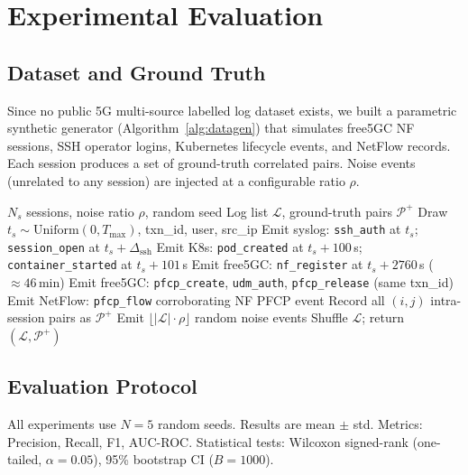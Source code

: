 \section{Experimental Evaluation}
\label{sec:experiments}

\subsection{Dataset and Ground Truth}
\label{sec:dataset}

Since no public 5G multi-source labelled log dataset exists, we built a
parametric synthetic generator (Algorithm~\ref{alg:datagen}) that
simulates free5GC NF sessions, SSH operator logins, Kubernetes lifecycle
events, and NetFlow records. Each session produces a set of ground-truth
correlated pairs. Noise events (unrelated to any session) are injected at
a configurable ratio $\rho$.

\begin{algorithm}[t]
\caption{Synthetic Dataset Generation}
\label{alg:datagen}
\begin{algorithmic}[1]
\Require $N_s$ sessions, noise ratio $\rho$, random seed
\Ensure Log list $\mathcal{L}$, ground-truth pairs $\mathcal{P}^+$
  \State Draw $t_s \sim \text{Uniform}(0, T_{\max})$, txn\_id, user, src\_ip
  \State Emit syslog: \texttt{ssh\_auth} at $t_s$; \texttt{session\_open} at $t_s + \Delta_{\text{ssh}}$
  \State Emit K8s: \texttt{pod\_created} at $t_s + 100$\,s; \texttt{container\_started} at $t_s + 101$\,s
  \State Emit free5GC: \texttt{nf\_register} at $t_s + 2760$\,s ($\approx 46$\,min)
  \State Emit free5GC: \texttt{pfcp\_create}, \texttt{udm\_auth}, \texttt{pfcp\_release} (same txn\_id)
  \State Emit NetFlow: \texttt{pfcp\_flow} corroborating NF PFCP event
  \State Record all $(i,j)$ intra-session pairs as $\mathcal{P}^+$
\EndFor
\State Emit $\lfloor|\mathcal{L}|\cdot\rho\rfloor$ random noise events
\State Shuffle $\mathcal{L}$; return $(\mathcal{L}, \mathcal{P}^+)$
\end{algorithmic}
\end{algorithm}

\subsection{Evaluation Protocol}

All experiments use $N=5$ random seeds. Results are mean $\pm$ std.
Metrics: Precision, Recall, F1, AUC-ROC. Statistical tests: Wilcoxon
signed-rank (one-tailed, $\alpha=0.05$), 95\% bootstrap CI ($B=1000$).


